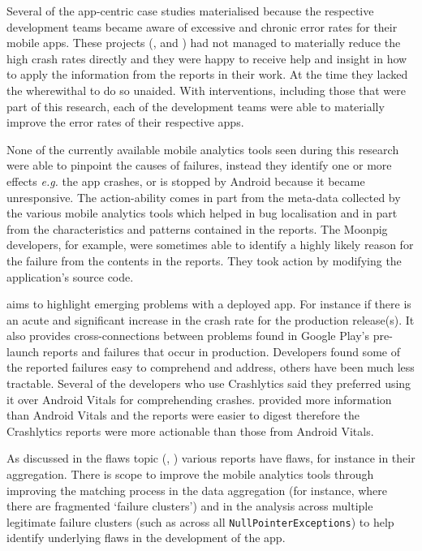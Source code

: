 Several of the app-centric case studies materialised because the respective development teams became aware of excessive and chronic error rates for their mobile apps. %
These projects (,  and ) had not managed to materially reduce the high crash rates directly and they were happy to receive help and insight in how to apply the information from the reports in their work. At the time they lacked the wherewithal to do so unaided. With interventions, including those that were part of this research, each of the development teams were able to materially improve the error rates of their respective apps.

None of the currently available mobile analytics tools seen during this research were able to pinpoint the causes of failures, instead they identify one or more effects \emph{e.g.} the app crashes, or is stopped by Android because it became unresponsive. The action-ability comes in part from the meta-data collected by the various mobile analytics tools which helped in bug localisation and in part from the characteristics and patterns contained in the reports. The Moonpig developers, for example, were sometimes able to identify a highly likely reason for the failure from the contents in the reports. They took action by modifying the application's source code.

 aims to highlight emerging problems with a deployed app. For instance if there is an acute and significant increase in the crash rate for the production release(s). It also provides cross-connections between problems found in Google Play's pre-launch reports and failures that occur in production. Developers found some of the reported failures easy to comprehend and address, others have been much less tractable. Several of the developers who use Crashlytics said they preferred using it over Android Vitals for comprehending crashes.  provided more information than Android Vitals and the reports were easier to digest therefore the Crashlytics reports were more actionable than those from Android Vitals.

As discussed in the flaws topic (, ) various reports have flaws, for instance in their aggregation. There is scope to improve the mobile analytics tools through improving the matching process in the data aggregation (for instance, where there are fragmented `failure clusters') and in the analysis across multiple legitimate failure clusters (such as across all \texttt{NullPointerExceptions}) to help identify underlying flaws in the development of the app.


